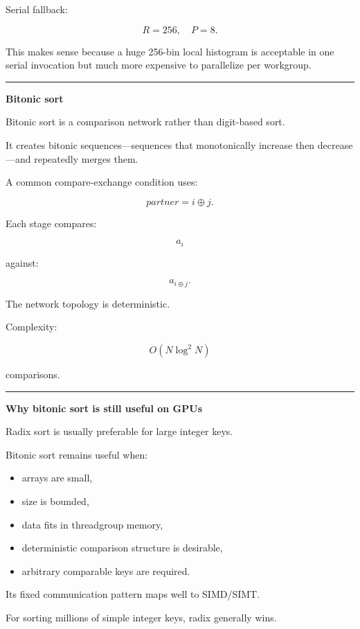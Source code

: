Serial fallback:

\[
R=256,
\quad
P=8.
\]

This makes sense because a huge 256-bin local histogram is acceptable in one serial invocation but much more expensive to parallelize per workgroup.

\begin{center}\rule{0.5\linewidth}{0.5pt}\end{center}

\textbf{Bitonic sort}

Bitonic sort is a comparison network rather than digit-based sort.

It creates bitonic sequences---sequences that monotonically increase then decrease---and repeatedly merges them.

A common compare-exchange condition uses:

\[
partner=i\oplus j.
\]

Each stage compares:

\[
a_i
\]

against:

\[
a_{i\oplus j}.
\]

The network topology is deterministic.

Complexity:

\[
\boxed{
O(N\log^2N)
}
\]

comparisons.

\begin{center}\rule{0.5\linewidth}{0.5pt}\end{center}

\textbf{Why bitonic sort is still useful on GPUs}

Radix sort is usually preferable for large integer keys.

Bitonic sort remains useful when:

\begin{itemize}
\tightlist
\item
  arrays are small,
\item
  size is bounded,
\item
  data fits in threadgroup memory,
\item
  deterministic comparison structure is desirable,
\item
  arbitrary comparable keys are required.
\end{itemize}

Its fixed communication pattern maps well to SIMD/SIMT.

For sorting millions of simple integer keys, radix generally wins.

